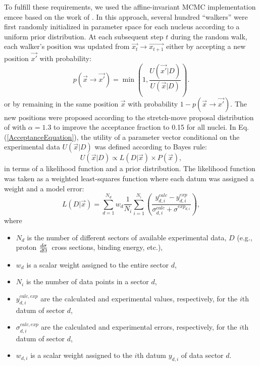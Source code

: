 \documentclass[twocolumn,secnumarabic,amssymb, nobibnotes, aps, prl,
superscriptaddress, nobalancelastpage]{revtex4}
\newcommand{\el}{\ensuremath{\frac{\lowercase{d}\sigma}{\lowercase{d}\Omega}}}
\begin{document}
To fulfill these requirements, we used the affine-invariant MCMC implementation
emcee \cite{Foreman-Mackey2013} based on the work of \cite{Goodman2010}. In this
approach, several hundred ``walkers'' were
first randomly initialized in parameter space for each nucleus according to a
uniform prior distribution. At each subsequent step $t$ during the
random walk, each walker's position was updated from $\vec{x_{t}} \rightarrow
\vec{x_{t+1}}$ either by accepting a new position $\vec{x'}$ with probability:
\begin{equation}\label{AcceptanceEquation}
    p(\vec{x}\rightarrow \vec{x'}) = \min(1,\frac{U(\vec{x'}|D)}{U(\vec{x}|D)}).
\end{equation}
or by remaining in the same position $\vec{x}$ with probability
$1-p(\vec{x}\rightarrow \vec{x'})$. The new positions were proposed according
to the stretch-move proposal distribution of \cite{Goodman2010} with $\alpha =
1.3$ to improve the acceptance fraction to 0.15 for all nuclei. In Eq.
(\ref{AcceptanceEquation}), the utility of a parameter vector conditional on the
experimental data $U(\vec{x}|D)$ was defined according to Bayes rule:
\begin{equation}
    U(\vec{x}|D) \propto L(D|\vec{x}) \times P(\vec{x}),
\end{equation}
in terms of a likelihood function and a prior distribution. The likelihood
function was taken as a weighted least-squares function where each datum was assigned
a weight and a model error:
\begin{equation} \label{LikelihoodFunction}
    L(D|\vec{x}) = \sum_{d=1}^{N_{d}} w_{d} \frac{1}{N_{i}} \sum_{i=1}^{N_{i}}
    \left(\frac{y^{calc}_{d,i}-y^{exp}_{d,i}}{\sigma^{calc}_{d,i}+\sigma^{exp_{d,i}}}\right),
\end{equation}
where
\begin{itemize}
    \item $N_{d}$ is the number of different sectors of available experimental
        data, $D$ (e.g., proton \el\ cross sections,
binding energy, etc.),
    \item $w_{d}$ is a scalar weight assigned to the entire sector $d$,
    \item $N_{i}$ is the number of data points in a sector $d$,
    \item $y^{calc, exp}_{d,i}$ are the calculated and experimental values,
        respectively, for the $i$th datum of sector $d$,
    \item $\sigma^{calc, exp}_{d,i}$ are the calculated and experimental errors,
        respectively, for the $i$th datum of sector $d$,
    \item $w_{d,i}$ is a scalar weight assigned to the $i$th datum
        $y_{d,i}$ of data sector $d$.
\end{itemize}
\end{document}
